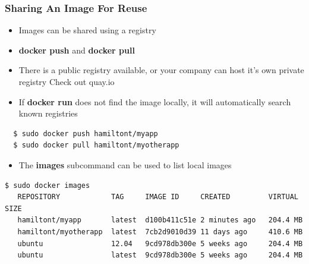 \documentclass[xcolor=dvipsnames]{beamer}
\newcommand{\cpause}{}
\begin{document}
\begin{frame}[fragile]
  \frametitle{Sharing An Image For Reuse}

  \begin{itemize}
    \item Images can be shared using a registry \cpause

    \item \textbf{docker push} and \textbf{docker pull} \cpause

    \item There is a public registry available, or your company can host it's 
    own private registry {\tiny Check out quay.io} \cpause

    \item If \textbf{docker run} does not find the image locally, it will 
    automatically search known registries \cpause
    
  \end{itemize}

  \begin{lstlisting}
  $ sudo docker push hamiltont/myapp
  $ sudo docker pull hamiltont/myotherapp
  \end{lstlisting}
  \cpause

  \begin{itemize}
    \item The \textbf{images} subcommand can be used to list local images
  \end{itemize}
  \cpause
  
  \begin{lstlisting}[basicstyle=\tiny]
   $ sudo docker images
   REPOSITORY            TAG     IMAGE ID     CREATED         VIRTUAL SIZE
   hamiltont/myapp       latest  d100b411c51e 2 minutes ago   204.4 MB
   hamiltont/myotherapp  latest  7cb2d9010d39 11 days ago     410.6 MB
   ubuntu                12.04   9cd978db300e 5 weeks ago     204.4 MB
   ubuntu                latest  9cd978db300e 5 weeks ago     204.4 MB
  \end{lstlisting}

\end{frame}
\end{document}
